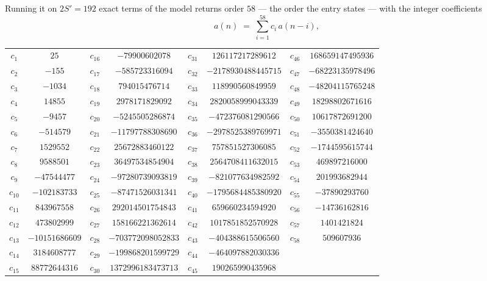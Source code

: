 \documentclass[11pt,a4paper]{article}
\theoremstyle{plain}
\theoremstyle{definition}
\begin{document}
Running it on $2S'=192$ exact terms of the model returns order $58$ --- the order the
entry states --- with the integer coefficients
\[
a(n)\;=\;\sum_{i=1}^{58}c_i\,a(n-i),
\]
\begin{center}\small
\begin{tabular}{cccccccc}
$c_{1}$ & $25$ & $c_{16}$ & $-79900602078$ & $c_{31}$ & $126117217289612$ & $c_{46}$ & $168659147495936$ \\
$c_{2}$ & $-155$ & $c_{17}$ & $-585723316094$ & $c_{32}$ & $-2178930488445715$ & $c_{47}$ & $-68223135978496$ \\
$c_{3}$ & $-1034$ & $c_{18}$ & $794015476714$ & $c_{33}$ & $118990560849959$ & $c_{48}$ & $-48204115765248$ \\
$c_{4}$ & $14855$ & $c_{19}$ & $2978171829092$ & $c_{34}$ & $2820058999043339$ & $c_{49}$ & $18298802671616$ \\
$c_{5}$ & $-9457$ & $c_{20}$ & $-5245505286874$ & $c_{35}$ & $-472376081290566$ & $c_{50}$ & $10617872691200$ \\
$c_{6}$ & $-514579$ & $c_{21}$ & $-11797788308690$ & $c_{36}$ & $-2978525389769971$ & $c_{51}$ & $-3550381424640$ \\
$c_{7}$ & $1529552$ & $c_{22}$ & $25672883460122$ & $c_{37}$ & $757851527306085$ & $c_{52}$ & $-1744595615744$ \\
$c_{8}$ & $9588501$ & $c_{23}$ & $36497534854904$ & $c_{38}$ & $2564708411632015$ & $c_{53}$ & $469897216000$ \\
$c_{9}$ & $-47544477$ & $c_{24}$ & $-97280739093819$ & $c_{39}$ & $-821077634982592$ & $c_{54}$ & $201993682944$ \\
$c_{10}$ & $-102183733$ & $c_{25}$ & $-87471526031341$ & $c_{40}$ & $-1795684485380920$ & $c_{55}$ & $-37890293760$ \\
$c_{11}$ & $843967558$ & $c_{26}$ & $292014501754843$ & $c_{41}$ & $659660234594920$ & $c_{56}$ & $-14736162816$ \\
$c_{12}$ & $473802999$ & $c_{27}$ & $158166221362614$ & $c_{42}$ & $1017851852570928$ & $c_{57}$ & $1401421824$ \\
$c_{13}$ & $-10151686609$ & $c_{28}$ & $-703772098052833$ & $c_{43}$ & $-404388615506560$ & $c_{58}$ & $509607936$ \\
$c_{14}$ & $3184608777$ & $c_{29}$ & $-199868201599729$ & $c_{44}$ & $-464097882030336$ &  &  \\
$c_{15}$ & $88772644316$ & $c_{30}$ & $1372996183473713$ & $c_{45}$ & $190265990435968$ &  &  \\
\end{tabular}
\end{center}
\end{document}

